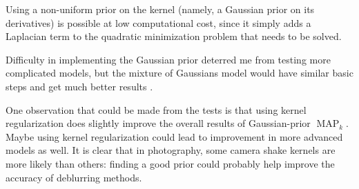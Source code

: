 \documentclass[english,a4paper]{article}
\theoremstyle{plain}
\theoremstyle{definition}
\theoremstyle{remark}
\DeclareMathOperator{\MAP}{MAP}
\begin{document}
Using a non-uniform prior on the kernel (namely, a Gaussian prior on its derivatives) is possible at low computational cost, since it simply adds a Laplacian term to the quadratic minimization problem that needs to be solved.

Difficulty in implementing the Gaussian prior deterred me from testing more complicated models, but the mixture of Gaussians model would have similar basic steps and get much better results \cite{levin2011efficient}.

One observation that could be made from the tests is that using kernel regularization does slightly improve the overall results of Gaussian-prior $\MAP_k$. 
Maybe using kernel regularization could lead to improvement in more advanced models as well. 
It is clear that in photography, some camera shake kernels are more likely than others: finding a good prior could probably help improve the accuracy of deblurring methods.




\end{document}
